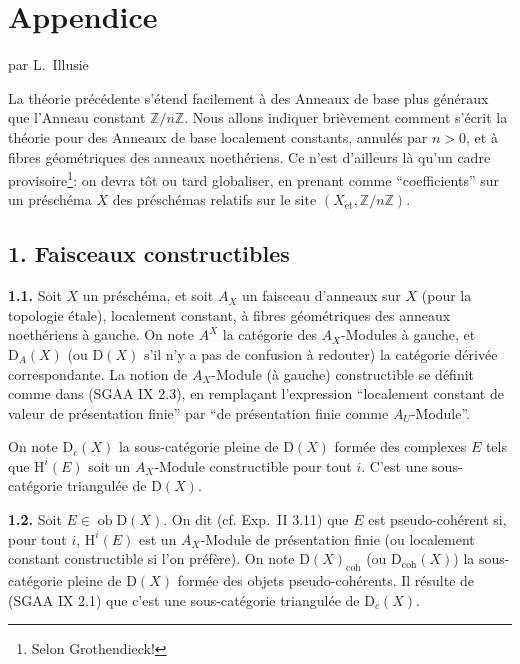 \documentclass[11pt]{article}
\renewcommand{\H}{\mathrm{H}}
\newcommand{\D}{\mathrm{D}}
\newcommand{\Z}{\mathbb{Z}}
\newcommand{\ob}{\operatorname{ob}}
\providecommand{\ob}{\operatorname{ob}}
\providecommand{\Z}{\mathbb Z}
\begin{document}
\section*{Appendice}
\begin{center}
par L.~Illusie
\end{center}

La théorie précédente s'étend facilement à des Anneaux de base plus généraux que l'Anneau constant $\Z/n\Z$. Nous allons indiquer brièvement comment s'écrit la théorie pour des Anneaux de base localement constants, annulés par $n>0$, et à fibres géométriques des anneaux noethériens. Ce n'est d'ailleurs là qu'un cadre provisoire\footnote{Selon Grothendieck!}: on devra tôt ou tard globaliser, en prenant comme ``coefficients'' sur un préschéma $X$ des préschémas relatifs sur le site $(X_{\mathrm{\acute et}},\Z/n\Z)$.

\subsection*{1. Faisceaux constructibles}

\textbf{1.1.} Soit $X$ un préschéma, et soit $A_X$ un faisceau d'anneaux sur $X$ (pour la topologie étale), localement constant, à fibres géométriques des anneaux noethériens à gauche. On note $A^{X}$ la catégorie des $A_X$-Modules à gauche, et $\D_A(X)$ (ou $\D(X)$ s'il n'y a pas de confusion à redouter) la catégorie dérivée correspondante. La notion de $A_X$-Module (à gauche) constructible se définit comme dans (SGAA IX 2.3), en remplaçant l'expression ``localement constant de valeur de présentation finie'' par ``de présentation finie comme $A_U$-Module''.

On note $\D_c(X)$ la sous-catégorie pleine de $\D(X)$ formée des complexes $E$ tels que $\H^i(E)$ soit un $A_X$-Module constructible pour tout $i$. C'est une sous-catégorie triangulée de $\D(X)$.

\textbf{1.2.} Soit $E\in\ob\D(X)$. On dit (cf. Exp.~II 3.11) que $E$ est pseudo-cohérent si, pour tout $i$, $\H^i(E)$ est un $A_X$-Module de présentation finie (ou localement constant constructible si l'on préfère). On note $\D(X)_{\mathrm{coh}}$ (ou $\D_{\mathrm{coh}}(X)$) la sous-catégorie pleine de $\D(X)$ formée des objets pseudo-cohérents. Il résulte de (SGAA IX 2.1) que c'est une sous-catégorie triangulée de $\D_c(X)$.
\end{document}
